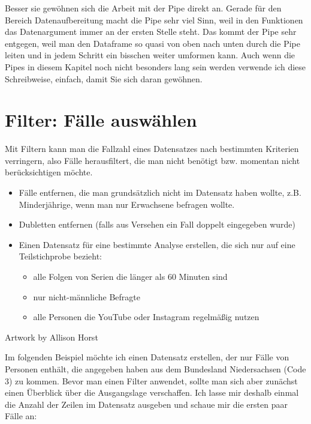 \documentclass[
]{book}
\begin{document}
Besser sie gewöhnen sich die Arbeit mit der Pipe direkt an. Gerade für den Bereich Datenaufbereitung macht die Pipe sehr viel Sinn, weil in den Funktionen das Datenargument immer an der ersten Stelle steht. Das kommt der Pipe sehr entgegen, weil man den Dataframe so quasi von oben nach unten durch die Pipe leiten und in jedem Schritt ein bisschen weiter umformen kann. Auch wenn die Pipes in diesem Kapitel noch nicht besonders lang sein werden verwende ich diese Schreibweise, einfach, damit Sie sich daran gewöhnen.

\hypertarget{filter-fuxe4lle-auswuxe4hlen}{%
\section{Filter: Fälle auswählen}\label{filter-fuxe4lle-auswuxe4hlen}}

Mit Filtern kann man die Fallzahl eines Datensatzes nach bestimmten Kriterien verringern, also Fälle herausfiltert, die man nicht benötigt bzw. momentan nicht berücksichtigen möchte.

\begin{itemize}
\item
  Fälle entfernen, die man grundsätzlich nicht im Datensatz haben wollte, z.B. Minderjährige, wenn man nur Erwachsene befragen wollte.
\item
  Dubletten entfernen (falls aus Versehen ein Fall doppelt eingegeben wurde)
\item
  Einen Datensatz für eine bestimmte Analyse erstellen, die sich nur auf eine Teilstichprobe bezieht:

  \begin{itemize}
  \item
    alle Folgen von Serien die länger als 60 Minuten sind
  \item
    nur nicht-männliche Befragte
  \item
    alle Personen die YouTube oder Instagram regelmäßig nutzen
  \end{itemize}
\end{itemize}

Artwork by Allison Horst

Im folgenden Beispiel möchte ich einen Datensatz erstellen, der nur Fälle von Personen enthält, die angegeben haben aus dem Bundesland Niedersachsen (Code 3) zu kommen. Bevor man einen Filter anwendet, sollte man sich aber zunächst einen Überblick über die Ausgangslage verschaffen. Ich lasse mir deshalb einmal die Anzahl der Zeilen im Datensatz ausgeben und schaue mir die ersten paar Fälle an:
\end{document}
